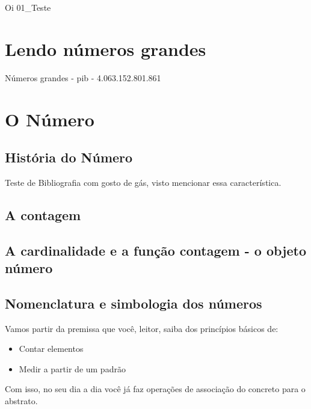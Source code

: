 Oi
{01_Teste}


\chapter[Lendo números grandes]{Lendo números grandes}
Números grandes - pib -
 4.063.152.801.861

\chapter[O Número]{O Número}

\section{História do Número}

Teste de Bibliografia \citet{Iezzi2019} com gosto de gás, visto \citet{Baldor2007Aritmetica} mencionar essa característica. \citet{Trajano1948} \nocite{Hernan1999}

\section{A contagem}

\section{A cardinalidade e a função contagem - o objeto número}

\section{Nomenclatura e simbologia dos números}

Vamos partir da premissa que você, leitor, saiba dos princípios básicos de:
\begin{itemize}[leftmargin=2cm]
    \item Contar elementos
    \item Medir a partir de um padrão
\end{itemize}

Com isso, no seu dia a dia você já faz operações de associação do concreto para o abstrato.\

